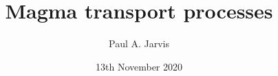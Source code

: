 \documentclass{beamer}
\title[Modeling volcanic processes]{Magma transport processes} %
\author[Paul Jarvis]{Paul A. Jarvis} %
\institute[UNIGE] %
{
\textit{paul.jarvis@unige.ch} %
}
\date{13th November 2020} %
\begin{document}
\begin{frame}
\titlepage %
\end{frame}





\end{document}
